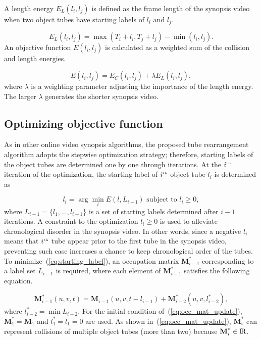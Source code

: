 \documentclass[11pt]{hyu_thesis}
\begin{document}
A length energy $E_L (l_i,l_j)$ is defined as the frame length of the synopsis video when two object tubes have starting labels of $l_i$ and $l_j$.

\begin{equation}
\label{eq:length_cost}
E_L(l_i, l_j) = \max(T_i + l_i, T_j + l_j) - \min(l_i, l_j).
\end{equation}
An objective function $E(l_i,l_j)$ is calculated as a weighted sum of the collision and length energies.

\begin{equation}
\label{eq:obj_func}
E(l_i, l_j) = E_C(l_i, l_j) + \lambda E_L(l_i, l_j),
\end{equation}
where $\lambda$ is a weighting parameter adjusting the importance of the length energy. The larger $\lambda$ generates the shorter synopsis video.

\subsection{Optimizing objective function}
As in other online video synopsis algorithms, the proposed tube rearrangement algorithm adopts the stepwise optimization strategy; therefore, starting labels of the object tubes are determined one by one through iterations. At the $i^\textrm{\tiny{th}}$ iteration of the optimization, the starting label of $i^\textrm{\tiny{th}}$ object tube $l_i$ is determined as

\begin{equation}
\label{eq:starting_label}
l_i = \arg\min_l E(l, L_{i-1}) \textrm{ subject to } l_i \geq 0,
\end{equation}
where $L_{i-1} = \{ {l}_{1},...,{l}_{i-1} \}$ is a set of starting labels determined after $i-1$ iterations. A constraint to the optimization ${l}_{i} \geq 0$ is used to alleviate chronological disorder in the synopsis video. In other words, since a negative $l_i$ means that ${i}^\textrm{\tiny{th}}$ tube appear prior to the first tube in the synopsis video, preventing such case increases a chance to keep chronological order of the tubes. To minimize~(\ref{eq:starting_label}), an occupation matrix $\textbf{M}_{i-1}^{*}$ corresponding to a label set $L_{i-1}$ is required, where each element of $\textbf{M}_{i-1}^{*}$  satisfies the following equation.

\begin{equation}
\label{eq:occ_mat_update}
\textbf{M}_{i-1}^{*}(u, v, t) = \textbf{M}_{i-1}(u, v, t - l_{i-1}) + \textbf{M}_{i-2}^{*}(u, v, l_{i-2}^{*}),
\end{equation}
where $l_{i-2}^{*} = \min L_{i-2}$. For the initial condition of~(\ref{eq:occ_mat_update}), $\textbf{M}_{1}^{*} = \textbf{M}_{1}$ and $l_{1}^{*} = l_{1} = 0$ are used. As shown in~(\ref{eq:occ_mat_update}), $\textbf{M}_{i}^{*}$ can represent collisions of multiple object tubes (more than two) because $\textbf{M}_{i}^{*} \in \rm I\!R$. 
\end{document}
